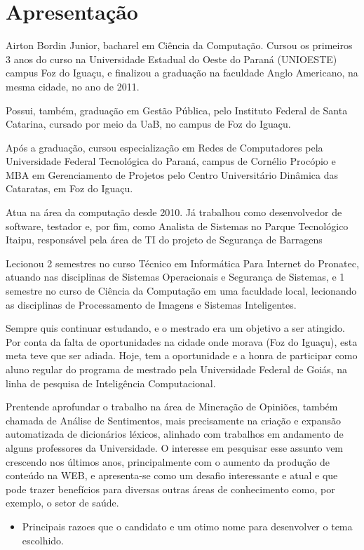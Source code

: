 \documentclass[a4paper,11pt]{article}
\begin{document}
\section{Apresentação}
Airton Bordin Junior, bacharel em Ciência da Computação. Cursou os primeiros 3 anos do curso na Universidade Estadual do Oeste do Paraná (UNIOESTE) campus Foz do Iguaçu, e finalizou a graduação na faculdade Anglo Americano, na mesma cidade, no ano de 2011.

Possui, também, graduação em Gestão Pública, pelo Instituto Federal de Santa Catarina, cursado por meio da UaB, no campus de Foz do Iguaçu.

Após a graduação, cursou especialização em Redes de Computadores pela Universidade Federal Tecnológica do Paraná, campus de Cornélio Procópio e MBA em Gerenciamento de Projetos pelo Centro Universitário Dinâmica das Cataratas, em Foz do Iguaçu.

Atua na área da computação desde 2010. Já trabalhou como desenvolvedor de software, testador e, por fim, como Analista de Sistemas no Parque Tecnológico Itaipu, responsável pela área de TI do projeto de Segurança de Barragens

Lecionou 2 semestres no curso Técnico em Informática Para Internet do Pronatec, atuando nas disciplinas de Sistemas Operacionais e Segurança de Sistemas, e 1 semestre no curso de Ciência da Computação em uma faculdade local, lecionando as disciplinas de Processamento de Imagens e Sistemas Inteligentes.

Sempre quis continuar estudando, e o mestrado era um objetivo a ser atingido. Por conta da falta de oportunidades na cidade onde morava (Foz do Iguaçu), esta meta teve que ser adiada. Hoje, tem a oportunidade e a honra de participar como aluno regular do programa de mestrado pela Universidade Federal de Goiás, na linha de pesquisa de Inteligência Computacional.

Prentende aprofundar o trabalho na área de Mineração de Opiniões, também chamada de Análise de Sentimentos, mais precisamente na criação e expansão automatizada de dicionários léxicos, alinhado com trabalhos em andamento de alguns professores da Universidade. O interesse em pesquisar esse assunto vem crescendo nos últimos anos, principalmente com o aumento da produção de conteúdo na WEB, e apresenta-se como um desafio interessante e atual e que pode trazer benefícios para diversas outras áreas de conhecimento como, por exemplo, o setor de saúde.

\begin{itemize}
\item{Principais razoes que o candidato e um otimo nome para desenvolver o tema escolhido.}
\end{itemize}
\end{document}
